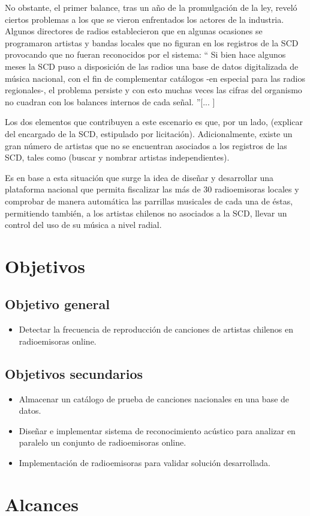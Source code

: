 No obstante, el primer balance, tras un año de la promulgación de la ley, reveló ciertos problemas a los que se vieron enfrentados los actores de la industria. Algunos directores de radios establecieron que en algunas ocasiones se programaron artistas y bandas locales que no figuran en los registros de la SCD provocando que no fueran reconocidos por el sistema: “ Si bien hace algunos meses la SCD puso a disposición de las radios una base de datos digitalizada de música nacional, con el fin de complementar catálogos -en especial para las radios regionales-, el problema persiste y con esto muchas veces las cifras del organismo no cuadran con los balances internos de cada señal.   ”[... ]

\bigskip

Los dos elementos que contribuyen a este escenario es que, por un lado, (explicar del encargado de la SCD, estipulado por licitación). Adicionalmente, existe un gran número de artistas que no se encuentran asociados a los registros de las SCD, tales como (buscar y nombrar artistas independientes).

\bigskip

Es en base a esta situación que surge la idea de diseñar y desarrollar una plataforma nacional que permita fiscalizar las más de 30 radioemisoras locales y comprobar de manera automática las parrillas musicales de cada una de éstas, permitiendo también, a los artistas chilenos no asociados a la SCD, llevar un control del uso de su música a nivel radial.


\section{Objetivos}

\subsection{Objetivo general} \label{sec:ObjetivoPrim}
\begin{itemize}
\item Detectar la frecuencia de reproducción de canciones de artistas chilenos en radioemisoras online.
\end{itemize}

\subsection{Objetivos secundarios} \label{sec:ObjetivosSec}
\begin{itemize}
\item Almacenar un catálogo de prueba de canciones nacionales en una base de datos.
\item Diseñar e implementar sistema de reconocimiento acústico para analizar en paralelo un conjunto de radioemisoras online.
\item Implementación de radioemisoras para validar solución desarrollada.
\end{itemize}
\section{Alcances} \label{sec:Alcances}
\lipsum[1-2]